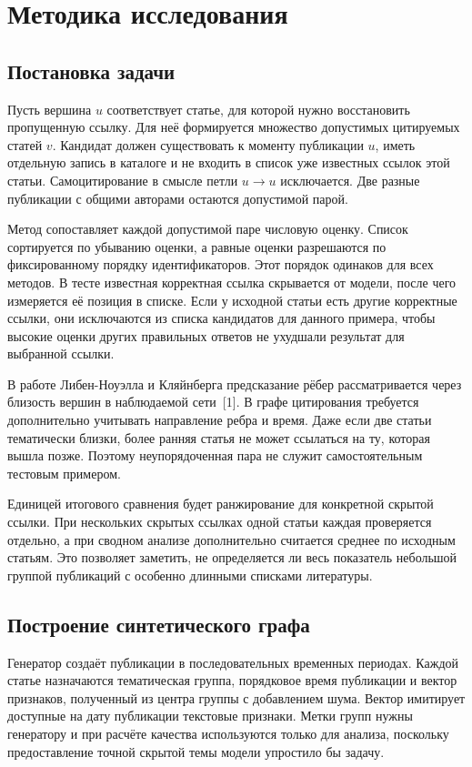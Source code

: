 \documentclass[a4paper,14pt,oneside]{extarticle}
\begin{document}
\clearpage
\section{Методика исследования}

\subsection{Постановка задачи}

Пусть вершина \(u\) соответствует статье, для которой нужно восстановить пропущенную ссылку.
Для неё формируется множество допустимых цитируемых статей \(v\). Кандидат должен существовать
к моменту публикации \(u\), иметь отдельную запись в каталоге и не входить в список уже известных
ссылок этой статьи. Самоцитирование в смысле петли \(u \to u\) исключается. Две разные публикации
с общими авторами остаются допустимой парой.

Метод сопоставляет каждой допустимой паре числовую оценку. Список сортируется по убыванию оценки,
а равные оценки разрешаются по фиксированному порядку идентификаторов. Этот порядок одинаков
для всех методов. В тесте известная корректная ссылка скрывается от модели, после чего измеряется
её позиция в списке. Если у исходной статьи есть другие корректные ссылки, они исключаются
из списка кандидатов для данного примера, чтобы высокие оценки других правильных ответов
не ухудшали результат для выбранной ссылки.

В работе Либен-Ноуэлла и Кляйнберга предсказание рёбер рассматривается через близость вершин
в наблюдаемой сети~[1]. В графе цитирования требуется дополнительно учитывать направление ребра
и время. Даже если две статьи тематически близки, более ранняя статья не может ссылаться на ту,
которая вышла позже. Поэтому неупорядоченная пара не служит самостоятельным тестовым примером.

Единицей итогового сравнения будет ранжирование для конкретной скрытой ссылки. При нескольких
скрытых ссылках одной статьи каждая проверяется отдельно, а при сводном анализе дополнительно
считается среднее по исходным статьям. Это позволяет заметить, не определяется ли весь показатель
небольшой группой публикаций с особенно длинными списками литературы.

\clearpage
\subsection{Построение синтетического графа}

Генератор создаёт публикации в последовательных временных периодах. Каждой статье назначаются
тематическая группа, порядковое время публикации и вектор признаков, полученный из центра группы
с добавлением шума. Вектор имитирует доступные на дату публикации текстовые признаки. Метки
групп нужны генератору и при расчёте качества используются только для анализа, поскольку
предоставление точной скрытой темы модели упростило бы задачу.
\end{document}

